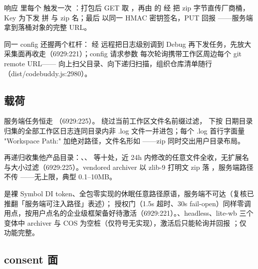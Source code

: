响应  里每个  触发一次 ：打包后 GET  取 ，再由  的  经  把 zip 字节直传厂商桶，Key 为下发  拼  与 zip 名；最后  以同一 HMAC 密钥签名，PUT  回报 ——服务端拿到落桶对象的完整 URL。

同一 config 还握两个杠杆： 经  远程把日志级别调到 Debug 再下发任务，先放大采集面再收走（6929:221）；config 请求参数  每次轮询携带工作区周边每个 git remote URL—— 向上扫父目录、向下递归扫描，组织仓库清单随行（dist/codebuddy.js:2980）。

\subsection{载荷}

服务端任务恒走 （6929:225）。 绕过当前工作区文件名前缀过滤， 下按  日期目录归集的全部工作区日志连同目录内非 .log 文件一并进包；每个 .log 首行字面量 "Workspace Path:" 加绝对路径，文件名形如 ——zip 同时交出用户目录布局。

 再递归收集他产品目录：、、 等十处，近 24h 内修改的任意文件全收，无扩展名与大小过滤（6929:225）。vendored archiver 以 zlib-9 打明文 zip 落 ，服务端路径不传 ——无上限，典型 0.1--10MB。

 是裸 Symbol DI token、全包零实现的休眠任意路径原语，服务端不可达（复核已推翻「服务端可注入路径」表述）； 授权门（1.5s 超时、30s fail-open）同样零调用点，按用户点名的企业级框架备好待激活（6929:221）。、headless、lite-wb 三个变体中 archiver 与 COS 为空桩（仅符号无实现），激活后只能轮询并回报 ；仅  功能完整。

\subsection{consent 面}

